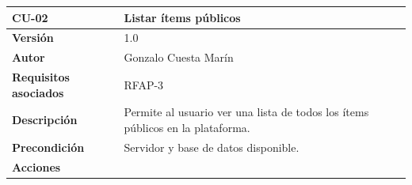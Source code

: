 \documentclass[
]{article}
\begin{document}
\begin{longtable}[]{@{}ll@{}}
\toprule
\begin{minipage}[b]{0.20\columnwidth}\raggedright
\textbf{CU-02}\strut
\end{minipage} & \begin{minipage}[b]{0.74\columnwidth}\raggedright
\textbf{Listar ítems públicos}\strut
\end{minipage}\tabularnewline
\midrule
\endhead
\begin{minipage}[t]{0.20\columnwidth}\raggedright
\textbf{Versión}\strut
\end{minipage} & \begin{minipage}[t]{0.74\columnwidth}\raggedright
1.0\strut
\end{minipage}\tabularnewline
\begin{minipage}[t]{0.20\columnwidth}\raggedright
\textbf{Autor}\strut
\end{minipage} & \begin{minipage}[t]{0.74\columnwidth}\raggedright
Gonzalo Cuesta Marín\strut
\end{minipage}\tabularnewline
\begin{minipage}[t]{0.20\columnwidth}\raggedright
\textbf{Requisitos asociados}\strut
\end{minipage} & \begin{minipage}[t]{0.74\columnwidth}\raggedright
RFAP-3\strut
\end{minipage}\tabularnewline
\begin{minipage}[t]{0.20\columnwidth}\raggedright
\textbf{Descripción}\strut
\end{minipage} & \begin{minipage}[t]{0.74\columnwidth}\raggedright
Permite al usuario ver una lista de todos los ítems públicos en la
plataforma.\strut
\end{minipage}\tabularnewline
\begin{minipage}[t]{0.20\columnwidth}\raggedright
\textbf{Precondición}\strut
\end{minipage} & \begin{minipage}[t]{0.74\columnwidth}\raggedright
Servidor y base de datos disponible.\strut
\end{minipage}\tabularnewline
\begin{minipage}[t]{0.20\columnwidth}\raggedright
\textbf{Acciones}\strut
\end{minipage} & \begin{minipage}[t]{0.74\columnwidth}\raggedright
\begin{enumerate}

\end{enumerate}
\end{minipage}
\end{longtable}
\end{document}
